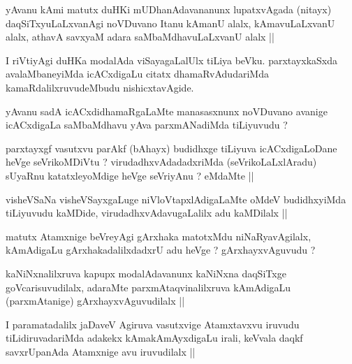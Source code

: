 \begin{artha}
yAvanu kAmi matutx duHKi mUDhanAdavananunx lupatxvAgada (nitayx)
daqSiTxyuLaLxvanAgi noVDuvano Itanu kAmanU alalx, kAmavuLaLxvanU
alalx, athavA savxyaM adara saMbaMdhavuLaLxvanU alalx ||
\end{artha}

\begin{artha}
I riVtiyAgi duHKa modalAda viSayagaLalUlx tiLiya beVku. parxtayxkaSxda
avalaMbaneyiMda icACxdigaLu citatx dhamaRvAdudariMda
kamaRdalilxruvudeMbudu nishicxtavAgide.
\end{artha}

\begin{artha}
yAvanu sadA icACxdidhamaRgaLaMte manasasxnunx noVDuvano avanige
icACxdigaLa saMbaMdhavu yAva parxmANadiMda tiLiyuvudu ?
\end{artha}

\begin{artha}
parxtayxgf vasutxvu parAkf (bAhayx) budidhxge tiLiyuva icACxdigaLoDane
heVge seVrikoMDiVtu ? virudadhxvAdadadxriMda (seVrikoLaLxlAradu)
sUyaRnu katatxleyoMdige heVge seVriyAnu ? eMdaMte ||
\end{artha}

\begin{artha}
visheVSaNa visheVSayxgaLuge niVloVtapxlAdigaLaMte oMdeV budidhxyiMda
tiLiyuvudu kaMDide, virudadhxvAdavugaLalilx adu kaMDilalx ||
\end{artha}

\begin{artha}
matutx Atamxnige beVreyAgi gArxhaka matotxMdu niNaRyavAgilalx,
kAmAdigaLu gArxhakadalilxdadxrU adu heVge ? gArxhayxvAguvudu ?
\end{artha}


\begin{artha}
kaNiNxnalilxruva kapupx modalAdavanunx kaNiNxna daqSiTxge
goVcarisuvudilalx, adaraMte parxmAtaqvinalilxruva kAmAdigaLu
(parxmAtanige) gArxhayxvAguvudilalx ||
\end{artha}

\begin{artha}
I paramatadalilx jaDaveV Agiruva vasutxvige Atamxtavxvu iruvudu
tiLidiruvadariMda adakekx kAmakAmAyxdigaLu irali, keVvala daqkf
savxrUpanAda Atamxnige avu iruvudilalx ||
\end{artha}


